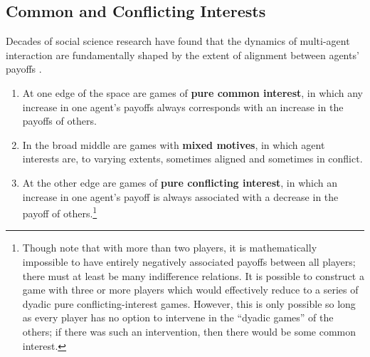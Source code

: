 \documentclass[11pt, a4paper, logo, onecolumn, nonumbering]{deepmind}
\begin{document}
\subsection{Common and Conflicting Interests}

Decades of social science research have found that the dynamics of multi-agent interaction are fundamentally shaped by the extent of alignment between agents' payoffs \cite{komorita1995interpersonal, rapoport1966taxonomy, robinson2005topology, schelling1980strategy}. 

\begin{enumerate}
    \item At one edge of the space are games of \textbf{pure common interest}, in which any increase in one agent's payoffs always corresponds with an increase in the payoffs of others.
    \item In the broad middle are games with \textbf{mixed motives}, in which agent interests are, to varying extents, sometimes aligned and sometimes in conflict.
    \item At the other edge are games of \textbf{pure conflicting interest}, in which an increase in one agent's payoff is always associated with a decrease in the payoff of others.\footnote{Though note that with more than two players, it is mathematically impossible to have entirely negatively associated payoffs between all players; there must at least be many indifference relations. It is possible to construct a game with three or more players which would effectively reduce to a series of dyadic pure conflicting-interest games. However, this is only possible so long as every player has no option to intervene in the ``dyadic games'' of the others; if there was such an intervention, then there would be some common interest.}
\end{enumerate}
\end{document}
